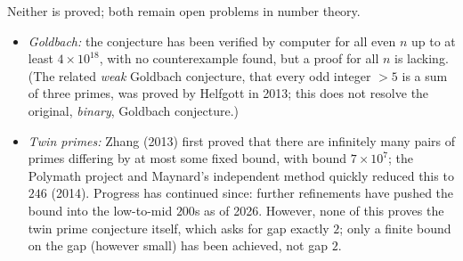 Neither is proved; both remain open problems in number theory.
\begin{itemize}
	\item \emph{Goldbach:} the conjecture has been verified by computer for all even $n$ up to at least $4\times10^{18}$, with no counterexample found, but a proof for all $n$ is lacking. (The related \emph{weak} Goldbach conjecture, that every odd integer $>5$ is a sum of three primes, was proved by Helfgott in 2013; this does not resolve the original, \emph{binary}, Goldbach conjecture.)
	\item \emph{Twin primes:} Zhang (2013) first proved that there are infinitely many pairs of primes differing by at most some fixed bound, with bound $7\times10^7$; the Polymath project and Maynard's independent method quickly reduced this to $246$ (2014). Progress has continued since: further refinements have pushed the bound into the low-to-mid $200$s as of 2026. However, none of this proves the twin prime conjecture itself, which asks for gap exactly $2$; only a finite bound on the gap (however small) has been achieved, not gap $2$.
\end{itemize}